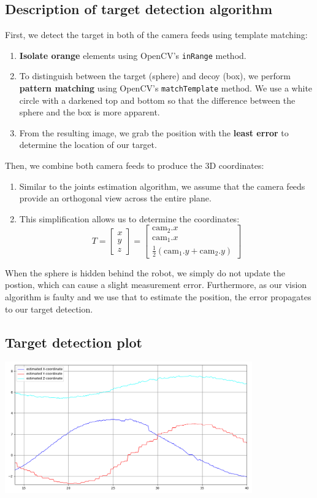 \subsection{Description of target detection algorithm}
First, we detect the target in both of the camera feeds using 
template matching:
\begin{enumerate}
    \item \textbf{Isolate orange} elements using OpenCV's \texttt{inRange}
        method.
    \item 
        To distinguish between the target (sphere) and decoy
        (box), we perform \textbf{pattern matching} using OpenCV's
        \texttt{matchTemplate} method.
        We use a white circle with a darkened top and bottom
        so that the difference between the sphere and the box
        is more apparent.
    \item
        From the resulting image, we grab the position with the
        \textbf{least error} to determine the location of our target.
\end{enumerate}
Then, we combine both camera feeds to produce the 3D coordinates:
\begin{enumerate}
    \item
        Similar to the joints estimation algorithm, we assume that
        the camera feeds provide an orthogonal view across the
        entire plane.
    \item
        This simplification allows us to determine the coordinates:
        \[
            T = \begin{bmatrix} x \\ y \\ z \end{bmatrix} =
            \begin{bmatrix} 
                \text{cam}_2.x \\
                \text{cam}_1.x \\
                \frac{1}{2} (\text{cam}_1.y + \text{cam}_2.y)
            \end{bmatrix} 
        \]
\end{enumerate}
When the sphere is hidden behind the robot, we simply do not update the postion, which can cause a slight measurement error. Furthermore, as our vision
algorithm is faulty and we use that to estimate the position, the error
propagates to our target detection.
\subsection{Target detection plot}
\begin{center}
    \includegraphics[width=0.8\textwidth]{plots/q2_2.png}
\end{center}
